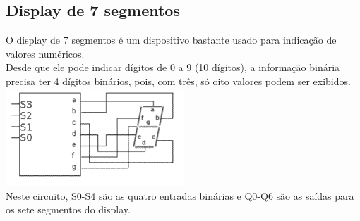 \documentclass[12pt,a4paper,portrait]{article}
\begin{document}
		\subsection{Display de 7 segmentos}
			O display de 7 segmentos é um dispositivo bastante usado para indicação de valores numéricos.\\
			Desde que ele pode indicar dígitos de 0 a 9 (10 dígitos), a informação binária precisa ter 4 dígitos binários, pois, com três, só oito valores podem ser exibidos.\\
			\includegraphics[width=0.5\textwidth]{imagens/7digit}\label{img:7digit}\\
			Neste circuito, S0-S4 são as quatro entradas binárias e Q0-Q6 são as saídas para os sete segmentos do display.\\
			\begin{table}[!h]
				\centering
				\caption{Tabela de verdade}
				\label{7digitl}
			\end{table}
\end{document}
